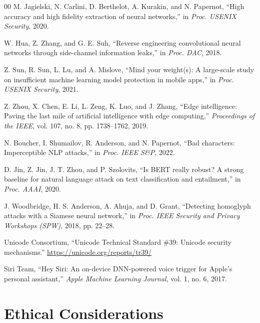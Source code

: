 \documentclass[letterpaper,twocolumn,10pt]{article}
\begin{document}
\begin{thebibliography}{00}
M. Jagielski, N. Carlini, D. Berthelot, A. Kurakin, and N. Papernot,
``High accuracy and high fidelity extraction of neural networks,'' in
\emph{Proc. USENIX Security}, 2020.

W. Hua, Z. Zhang, and G. E. Suh, ``Reverse engineering convolutional neural
networks through side-channel information leaks,'' in \emph{Proc. DAC},
2018.

Z. Sun, R. Sun, L. Lu, and A. Mislove, ``Mind your weight(s): A large-scale
study on insufficient machine learning model protection in mobile apps,'' in
\emph{Proc. USENIX Security}, 2021.

Z. Zhou, X. Chen, E. Li, L. Zeng, K. Luo, and J. Zhang, ``Edge
intelligence: Paving the last mile of artificial intelligence with edge
computing,'' \emph{Proceedings of the IEEE}, vol. 107, no. 8,
pp. 1738--1762, 2019.

N. Boucher, I. Shumailov, R. Anderson, and N. Papernot, ``Bad characters:
Imperceptible NLP attacks,'' in \emph{Proc. IEEE S\&P}, 2022.

D. Jin, Z. Jin, J. T. Zhou, and P. Szolovits, ``Is BERT really robust? A
strong baseline for natural language attack on text classification and
entailment,'' in \emph{Proc. AAAI}, 2020.

J. Woodbridge, H. S. Anderson, A. Ahuja, and D. Grant, ``Detecting
homoglyph attacks with a Siamese neural network,'' in \emph{Proc. IEEE
Security and Privacy Workshops (SPW)}, 2018, pp. 22--28.

Unicode Consortium, ``Unicode Technical Standard \#39: Unicode security
mechanisms.''
\url{https://unicode.org/reports/tr39/}

Siri Team, ``Hey Siri: An on-device DNN-powered voice trigger for Apple's
personal assistant,'' \emph{Apple Machine Learning Journal}, vol. 1,
no. 6, 2017.

\end{thebibliography}

\appendix
\section{Ethical Considerations}
\label{app:ethics}
\end{document}
